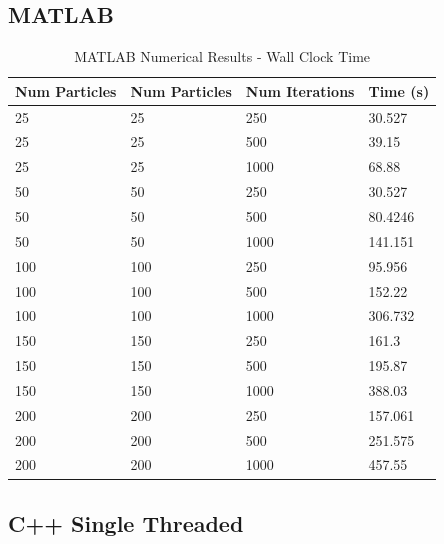 \subsection{MATLAB}

\begin{table}[H]
    \centering
    \begin{tabular}{@{}llll@{}}
    \toprule
    \textbf{Num Particles} & \textbf{Num Particles} & \textbf{Num Iterations} & \textbf{Time (s)} \\ \midrule
    25            & 25            & 250            & 30.527   \\
    25            & 25            & 500            & 39.15    \\
    25            & 25            & 1000           & 68.88    \\
    50            & 50            & 250            & 30.527   \\
    50            & 50            & 500            & 80.4246  \\
    50            & 50            & 1000           & 141.151  \\
    100           & 100           & 250            & 95.956   \\
    100           & 100           & 500            & 152.22   \\
    100           & 100           & 1000           & 306.732  \\
    150           & 150           & 250            & 161.3    \\
    150           & 150           & 500            & 195.87   \\
    150           & 150           & 1000           & 388.03   \\
    200           & 200           & 250            & 157.061  \\
    200           & 200           & 500            & 251.575  \\
    200           & 200           & 1000           & 457.55   \\ \bottomrule
    \end{tabular}
    \caption{MATLAB Numerical Results - Wall Clock Time}
    \label{tab:MATLAB-speedup}
    \end{table}

\subsection{C++ Single Threaded}

